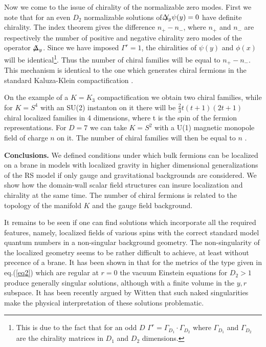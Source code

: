 \documentclass[a4paper,12pt]{article}
\begin{document}
Now we come to the issue of chirality of the normalizable zero modes.
First we note that for an even $D_2$ normalizable solutions of 
$\not\hspace{-0.2cm}{\Delta}_y\psi(y)=0$ have definite chirality. The
index theorem gives the difference $n_+-n_-$, where $n_+$ and $n_-$
are respectively the number of positive and negative chirality zero
modes of the operator $\not\hspace{-0.1cm}{\Delta}_y$. Since we have
imposed $\Gamma^r =1$, the chiralities of $\psi(y)$ and $\phi(x)$
will be identical\footnote{This is due to the fact that for an odd
$D$ $\Gamma^r = \Gamma_{D_1}\cdot\Gamma_{D_2}$ where $\Gamma_{D_1}$
and $\Gamma_{D_2}$ are the chirality matrices in $D_1$ and $D_2$
dimensions.}. Thus the number of chiral families will be equal to
$n_+-n_-$. This mechanism is identical to the one which generates
chiral fermions in the standard Kaluza-Klein compactification
\cite{seif1}.

On the example of a  $K=K_3$ compactification we obtain two chiral
families, while for $K=S^4$ with an SU(2) instanton on it there will
be  $\frac{2}{3} t(t+1)(2t+1)$ chiral localized families in 4
dimensions,  where t is the spin of the fermion representations. For
$D=7$ we can take $K=S^2$ with a U(1) magnetic monopole field of
charge $n$ on it. The number of chiral families will then be equal to
$n$ \cite{seif2}.

{\bf Conclusions.} We defined conditions under which bulk
fermions can be localized on a brane in models with localized gravity
in higher dimensional generalizations of the RS model if only gauge
and gravitational backgrounds are considered. We show how the domain-wall
scalar field structures can insure localization and chirality at the
same time. The number of chiral fermions is related to the topology
of the manifold $K$ and the gauge field background.

It remains to be seen if one can find solutions which incorporate all
the required features, namely, localized fields of various spins with
the correct standard model quantum numbers in a non-singular
background geometry. The non-singularity of the localized geometry
seems to be rather difficult to achieve, at least without precence of
a brane. It has been shown in \cite{seif} that for the metrics of the
type given in eq.(\ref{eq2}) which are regular at $r=0$ the vacuum
Einstein equations for $D_2>1$ produce generally singular solutions,
although with a finite volume in the $y,r$ subspace. It has been
recently argued by Witten \cite{Witt} that such naked singularities
make the physical interpretation of these solutions problematic.
\end{document}

